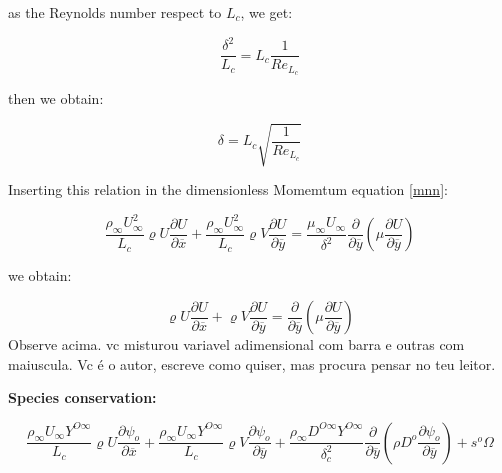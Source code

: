   
as the Reynolds number respect to $L_c$, we get:
  
  
\begin{equation} 
\frac{\delta^2}{L_c}    =L_c\frac{1}{Re_{L_c}}
\end{equation} 
  
  
then we obtain:
  
  
\begin{equation} 
\delta=L_c\sqrt{\frac{1}{Re_{L_c}}}
\end{equation} 


Inserting this relation in the dimensionless Momemtum equation \ref{mnn}: 

\begin{equation} 
\frac{\rho_{\infty}U_{\infty}^2}{L_c}\varrho U\frac{\partial U}{\partial \overline{x}}+
\frac{\rho_{\infty}U_{\infty}^2}{L_c}\varrho V\frac{\partial U}{\partial \overline{y}}=
\frac{\mu_{\infty}U_{\infty}}{\delta^2}\frac{\partial}{\partial \overline{y}}\left(\mu\frac{\partial U}{\partial  \overline{y}}\right)
\label{mn1}
\end{equation} 

we obtain:

\begin{equation} 
\varrho U\frac{\partial U}{\partial \overline{x}}+
\varrho V\frac{\partial U}{\partial \overline{y}}=
\frac{\partial}{\partial \overline{y}}\left(\mu\frac{\partial U}{\partial  \overline{y}}\right)
\end{equation} 
{\color{red} Observe acima. vc misturou variavel adimensional com barra e outras com maiuscula. Vc é o autor, escreve como quiser, mas procura pensar no teu leitor.}

\textbf{Species conservation:}

\begin{equation} 
\frac{\rho_{\infty}U_{\infty}Y^{O\infty}}{L_c}\varrho U\frac{\partial \psi_{o}}{\partial\overline{x}}+
\frac{\rho_{\infty}U_{\infty}Y^{O\infty}}{L_c}\varrho V\frac{\partial \psi_{o}}{\partial\overline{y}}+
\frac{\rho_{\infty}D^{O\infty}Y^{O\infty}}{\delta_c^2}\frac{\partial}{\partial \overline{y}}\left(\rho D^o\frac{\partial \psi_o}{\partial \overline{y}}\right)+
s^{o}\Omega
\end{equation} 

